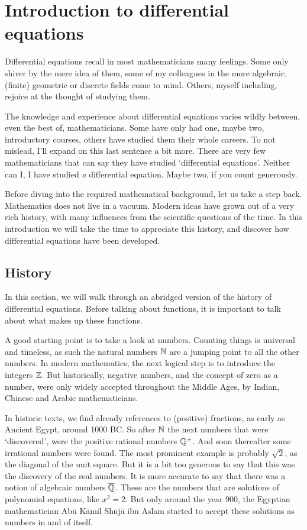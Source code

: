 

\chapter{Introduction to differential equations}

Differential equations recall in most mathematicians many feelings. Some only shiver by the mere idea of them, some of my colleagues in the more algebraic, (finite) geometric or discrete fields come to mind. Others, myself including, rejoice at the thought of studying them.

The knowledge and experience about differential equations varies wildly between, even the best of, mathematicians. Some have only had one, maybe two, introductory courses, others have studied them their whole careers. To not mislead, I'll expand on this last sentence a bit more. There are very few mathematicians that can say they have studied `differential equations'. Neither can I, I have studied \emph{a} differential equation. Maybe two, if you count generously.

Before diving into the required mathematical background, let us take a step back. Mathematics does not live in a vacuum. Modern ideas have grown out of a very rich history, with many influences from the scientific questions of the time. In this introduction we will take the time to appreciate this history, and discover how differential equations have been developed.

\section{History}

In this section, we will walk through an abridged version of the history of differential equations. Before talking about functions, it is important to talk about what makes up these functions.

A good starting point is to take a look at numbers. Counting things is universal and timeless, as such the natural numbers $\mathbb{N}$ are a jumping point to all the other numbers. In modern mathematics, the next logical step is to introduce the integers $\mathbb{Z}$. But historically, negative numbers, and the concept of zero as a number, were only widely accepted throughout the Middle Ages, by Indian, Chinese and Arabic mathematicians.

In historic texts, we find already references to (positive) fractions, as early as Ancient Egypt, around 1000 BC. So after $\mathbb{N}$ the next numbers that were `discovered', were the positive rational numbers $\mathbb{Q}^+$. And soon thereafter some irrational numbers were found. The most prominent example is probably $\sqrt{2}$, as the diagonal of the unit square. But it is a bit too generous to say that this was the discovery of the real numbers. It is more accurate to say that there was a notion of algebraic numbers $\overline{\mathbb{Q}}$. These are the numbers that are solutions of polynomial equations, like $x^2 = 2$. But only around the year 900, the Egyptian mathematician Abū Kāmil Shujā ibn Aslam started to accept these solutions as numbers in and of itself.

